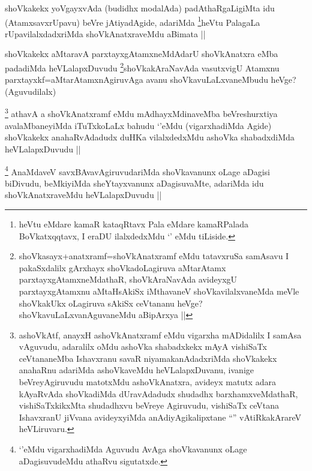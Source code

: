 
\begin{artha}
shoVkakekx yoVgayxvAda (budidhx modalAda) padAthaRgaLigiMta idu (AtamxsavxrUpavu) beVre jAtiyadAgide, adariMda \footnote{heVtu eMdare kamaR kataqRtavx Pala eMdare kamaRPalada BoVkatxqqtavx, I eraDU ilalxdedxMdu `\stext' eMdu tiLiside.}heVtu PalagaLa rUpavilalxdadxriMda shoVkAnatxraveMdu aBimata ||
\end{artha}


\begin{artha}
shoVkakekx aMtaravA parxtayxgAtamxneMdAdarU shoVkAnatxra eMba padadiMda heVLalapxDuvudu \footnote{shoVkasayx+anatxramf=shoVkAnatxramf eMdu tatavxruSa samAsavu I pakaSxdalilx gArxhayx shoVkadoLagiruva aMtarAtamx parxtayxgAtamxneMdathaR, shoVkAraNavAda avideyxgU parxtayxgAtamxnu aMtaHsAkiSx iMthavaneV shoVkavilalxvaneMda meVle shoVkakUkx oLagiruva sAkiSx  ceVtananu heVge? shoVkavuLaLxvanAguvaneMdu aBipArxya ||}shoVkakAraNavAda vasutxvigU Atamxnu parxtayxkf=aMtarAtamxnAgiruvAga avanu shoVkavuLaLxvaneMbudu heVge? (Aguvudilalx)
\end{artha}


\begin{artha}
\footnote{ashoVkAtf, anayxH ashoVkAnatxramf eMdu vigarxha mADidalilx I samAsa vAguvudu, adaralilx oMdu ashoVka shabadxkekx mAyA vishiSaTx ceVtananeMba Ishavxranu savaR niyamakanAdadxriMda shoVkakekx anahaRnu adariMda ashoVkaveMdu heVLalapxDuvanu, ivanige beVreyAgiruvudu matotxMdu ashoVkAnatxra, avideyx matutx adara kAyaRvAda shoVkadiMda dUravAdadudx shudadhx barxhamxveMdathaR, vishiSaTxkikxMta shudadhx\-vu beVreye Agiruvudu, vishiSaTx ceVtana IshavxranU jiVvana avideyxyiMda anAdiyAgikalipxtane ``\stext'' vAtiRkakArareV heVLiruvaru.}
athavA a shoVkAnatxramf eMdu mAdhayxMdinaveMba beVreshurxtiya avalaMbaneyiMda iTuTxkoLaLx bahudu `\stext'eMdu (vigarxhadiMda Agide) shoVkakekx anahaRvAdadudx duHKa vilalxdedxMdu ashoVka shabadxdiMda heVLalapxDuvudu ||
\end{artha}


\begin{artha}
\footnote{`\stext'eMdu vigarxhadiMda Aguvudu AvAga shoVkavanunx oLage aDagisuvudeMdu athaRvu sigutatxde.}
AnaMdaveV savxBAvavAgiruvudariMda shoVkavanunx oLage aDagisi biDivudu, beMkiyiMda sheYtayxvanunx aDagisuvaMte, adariMda idu shoVkAnatxraveMdu heVLalapxDuvudu ||
\end{artha}

